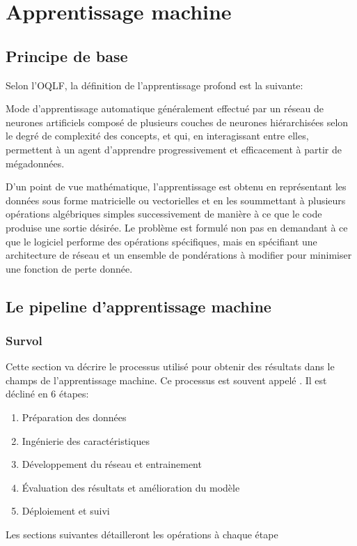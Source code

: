 \section{Apprentissage machine}
  \subsection{Principe de base}
    Selon l'\ac{OQLF}\parencite{oqlf_apprentissage_2024}, la définition de l'apprentissage profond est la suivante:
    \begin{definition}
    Mode d'apprentissage automatique généralement effectué par un réseau de neurones artificiels composé de plusieurs couches de neurones hiérarchisées selon le degré de complexité des concepts, et qui, en interagissant entre elles, permettent à un agent d'apprendre progressivement et efficacement à partir de mégadonnées.
    \end{definition}
    D'un point de vue mathématique, l'apprentissage est obtenu en représentant les données sous forme matricielle ou vectorielles et en les soummettant à plusieurs opérations algébriques simples successivement de manière à ce que le code produise une sortie désirée. Le problème est formulé non pas en demandant à ce que le logiciel performe des opérations spécifiques, mais en spécifiant une architecture de réseau et un ensemble de pondérations à modifier pour minimiser une fonction de perte donnée.
  \subsection{Le pipeline d'apprentissage machine}
  \subsubsection{Survol}
      Cette section va décrire le processus utilisé pour obtenir des résultats dans le champs de l'apprentissage machine. Ce processus est souvent appelé  \fg{}. Il est décliné en 6 étapes:
        \begin{enumerate}
          \item Préparation des données
          \item Ingénierie des caractéristiques
          \item Développement du réseau et entrainement
          \item Évaluation des résultats et amélioration du modèle
          \item Déploiement et suivi
        \end{enumerate}
      Les sections suivantes détailleront les opérations à chaque étape

